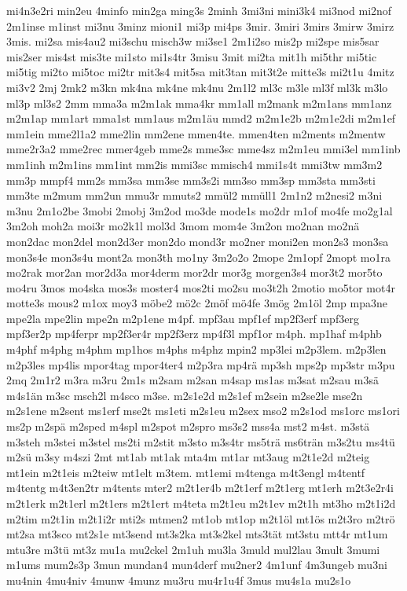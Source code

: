 {mi4n3e2ri
min2eu
4minfo
min2ga
ming3s
2minh
3mi3ni
mini3k4
mi3nod
mi2nof
2m1inse
m1inst
mi3nu
3minz
mioni1
mi3p
mi4ps
3mir.
3miri
3mirs
3mirw
3mirz
3mis.
mi2sa
mis4au2
mi3schu
misch3w
mi3se1
2m1i2so
mis2p
mi2spe
mis5sar
mis2ser
mis4st
mis3te
mi1sto
mi1s4tr
3misu
3mit
mi2ta
mit1h
mi5thr
mi5tic
mi5tig
mi2to
mi5toc
mi2tr
mit3s4
mit5sa
mit3tan
mit3t2e
mitte3s
mi2t1u
4mitz
mi3v2
2mj
2mk2
m3kn
mk4na
mk4ne
mk4nu
2m1l2
ml3c
m3le
ml3f
ml3k
m3lo
ml3p
ml3s2
2mm
mma3a
m2m1ak
mma4kr
mm1all
m2mank
m2m1ans
mm1anz
m2m1ap
mm1art
mma1st
mm1aus
m2m1äu
mmd2
m2m1e2b
m2m1e2di
m2m1ef
mm1ein
mme2l1a2
mme2lin
mm2ene
mmen4te.
mmen4ten
m2ments
m2mentw
mme2r3a2
mme2rec
mmer4geb
mme2s
mme3sc
mme4sz
m2m1eu
mmi3el
mm1inb
mm1inh
m2m1ins
mm1int
mm2is
mmi3sc
mmisch4
mmi1s4t
mmi3tw
mm3m2
mm3p
mmpf4
mm2s
mm3sa
mm3se
mm3s2i
mm3so
mm3sp
mm3sta
mm3sti
mm3te
m2mum
mm2un
mmu3r
mmuts2
mmül2
mmüll1
2m1n2
m2nesi2
m3ni
m3nu
2m1o2be
3mobi
2mobj
3m2od
mo3de
mode1s
mo2dr
m1of
mo4fe
mo2g1al
3m2oh
moh2a
moi3r
mo2k1l
mol3d
3mom
mom4e
3m2on
mo2nan
mo2nä
mon2dac
mon2del
mon2d3er
mon2do
mond3r
mo2ner
moni2en
mon2s3
mon3sa
mon3s4e
mon3s4u
mont2a
mon3th
mo1ny
3m2o2o
2mope
2m1opf
2mopt
mo1ra
mo2rak
mor2an
mor2d3a
mor4derm
mor2dr
mor3g
morgen3s4
mor3t2
mor5to
mo4ru
3mos
mo4ska
mos3s
moster4
mos2ti
mo2su
mo3t2h
2motio
mo5tor
mot4r
motte3s
mous2
m1ox
moy3
möbe2
mö2c
2möf
mö4fe
3mög
2m1öl
2mp
mpa3ne
mpe2la
mpe2lin
mpe2n
m2p1ene
m4pf.
mpf3au
mpf1ef
mp2f3erf
mpf3erg
mpf3er2p
mp4ferpr
mp2f3er4r
mp2f3erz
mp4f3l
mpf1or
m4ph.
mp1haf
m4phb
m4phf
m4phg
m4phm
mp1hos
m4phs
m4phz
mpin2
mp3lei
m2p3lem.
m2p3len
m2p3les
mp4lis
mpor4tag
mpor4ter4
m2p3ra
mp4rä
mp3sh
mps2p
mp3str
m3pu
2mq
2m1r2
m3ra
m3ru
2m1s
m2sam
m2san
m4sap
ms1as
m3sat
m2sau
m3sä
m4s1än
m3sc
msch2l
m4sco
m3se.
m2s1e2d
m2s1ef
m2sein
m2se2le
mse2n
m2s1ene
m2sent
ms1erf
mse2t
ms1eti
m2s1eu
m2sex
mso2
m2s1od
ms1orc
ms1ori
ms2p
m2spä
m2sped
m4spl
m2spot
m2spro
ms3s2
mss4a
mst2
m4st.
m3stä
m3steh
m3stei
m3stel
ms2ti
m2stit
m3sto
m3s4tr
ms5trä
ms6trän
m3s2tu
ms4tü
m2sü
m3sy
m4szi
2mt
mt1ab
mt1ak
mta4m
mt1ar
mt3aug
m2t1e2d
m2teig
mt1ein
m2t1eis
m2teiw
mt1elt
m3tem.
mt1emi
m4tenga
m4t3engl
m4tentf
m4tentg
m4t3en2tr
m4tents
mter2
m2t1er4b
m2t1erf
m2t1erg
mt1erh
m2t3e2r4i
m2t1erk
m2t1erl
m2t1ers
m2t1ert
m4teta
m2t1eu
m2t1ev
m2t1h
mt3ho
m2t1i2d
m2tim
m2t1in
m2t1i2r
mti2s
mtmen2
mt1ob
mt1op
m2t1öl
mt1ös
m2t3ro
m2trö
mt2sa
mt3sco
mt2s1e
mt3send
mt3s2ka
mt3s2kel
mts3tät
mt3stu
mtt4r
mt1um
mtu3re
m3tü
mt3z
mu1a
mu2ckel
2m1uh
mu3la
3muld
mul2lau
3mult
3mumi
m1ums
mum2s3p
3mun
mundan4
mun4derf
mu2ner2
4m1unf
4m3ungeb
mu3ni
mu4nin
4mu4niv
4munw
4munz
mu3ru
mu4r1u4f
3mus
mu4s1a
mu2s1o
}
